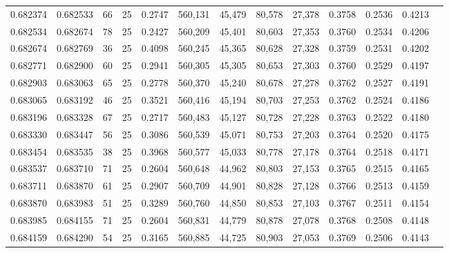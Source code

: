 \begin{tabular}{rrrrrrrrrrrrr}
0.682374 & 0.682533 &    66 &  25 &                                     0.2747 & 560,131 &  45,479 &  80,578 &  27,378 & 0.3758 & 0.2536 & 0.4213 \\
0.682534 & 0.682674 &    78 &  25 &                                     0.2427 & 560,209 &  45,401 &  80,603 &  27,353 & 0.3760 & 0.2534 & 0.4206 \\
0.682674 & 0.682769 &    36 &  25 &                                     0.4098 & 560,245 &  45,365 &  80,628 &  27,328 & 0.3759 & 0.2531 & 0.4202 \\
0.682771 & 0.682900 &    60 &  25 &                                     0.2941 & 560,305 &  45,305 &  80,653 &  27,303 & 0.3760 & 0.2529 & 0.4197 \\
0.682903 & 0.683063 &    65 &  25 &                                     0.2778 & 560,370 &  45,240 &  80,678 &  27,278 & 0.3762 & 0.2527 & 0.4191 \\
0.683065 & 0.683192 &    46 &  25 &                                     0.3521 & 560,416 &  45,194 &  80,703 &  27,253 & 0.3762 & 0.2524 & 0.4186 \\
0.683196 & 0.683328 &    67 &  25 &                                     0.2717 & 560,483 &  45,127 &  80,728 &  27,228 & 0.3763 & 0.2522 & 0.4180 \\
0.683330 & 0.683447 &    56 &  25 &                                     0.3086 & 560,539 &  45,071 &  80,753 &  27,203 & 0.3764 & 0.2520 & 0.4175 \\
0.683454 & 0.683535 &    38 &  25 &                                     0.3968 & 560,577 &  45,033 &  80,778 &  27,178 & 0.3764 & 0.2518 & 0.4171 \\
0.683537 & 0.683710 &    71 &  25 &                                     0.2604 & 560,648 &  44,962 &  80,803 &  27,153 & 0.3765 & 0.2515 & 0.4165 \\
0.683711 & 0.683870 &    61 &  25 &                                     0.2907 & 560,709 &  44,901 &  80,828 &  27,128 & 0.3766 & 0.2513 & 0.4159 \\
0.683870 & 0.683983 &    51 &  25 &                                     0.3289 & 560,760 &  44,850 &  80,853 &  27,103 & 0.3767 & 0.2511 & 0.4154 \\
0.683985 & 0.684155 &    71 &  25 &                                     0.2604 & 560,831 &  44,779 &  80,878 &  27,078 & 0.3768 & 0.2508 & 0.4148 \\
0.684159 & 0.684290 &    54 &  25 &                                     0.3165 & 560,885 &  44,725 &  80,903 &  27,053 & 0.3769 & 0.2506 & 0.4143 \\

\end{tabular}
